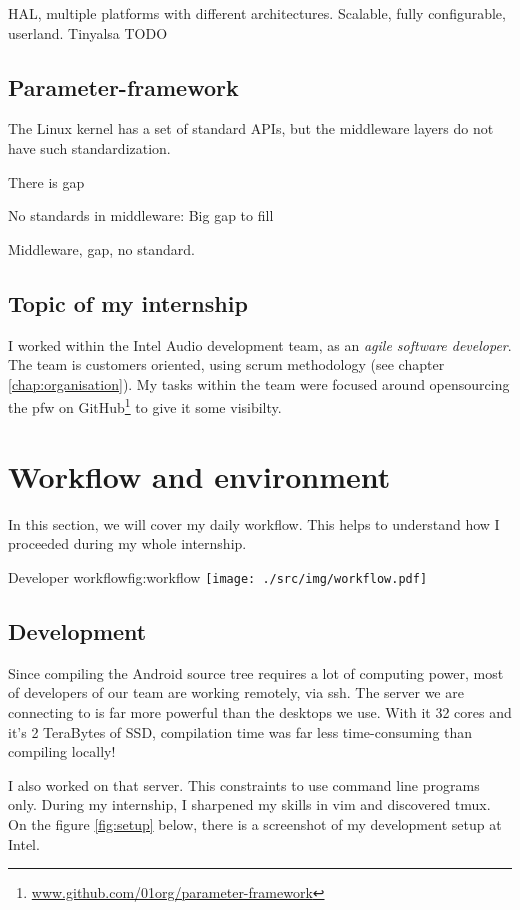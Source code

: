 HAL, multiple platforms with different architectures.
Scalable, fully configurable, userland.
Tinyalsa
TODO

\subsection{Parameter-framework}
\label{sec:parameter-framework}
The Linux \gls{kernel} has a set of standard APIs, but the middleware layers do not have such standardization.

There is gap

No standards in middleware:
Big gap to fill


Middleware, gap, no standard.

\subsection{Topic of my internship}

I worked within the Intel Audio development team, as an \emph{agile
software developer}. The team is customers oriented, using \gls{scrum}
methodology (see chapter \ref{chap:organisation}). My tasks
within the team were focused around opensourcing the \gls{pfw} on
GitHub\footnote{\url{www.github.com/01org/parameter-framework}} to give it some
visibilty.


\section{Workflow and environment}
In this section, we will cover my daily workflow. This helps
to understand how I proceeded during my whole internship.

\begin{figureGraphics}{Developer workflow}{fig:workflow}
    \texttt{[image: ./src/img/workflow.pdf]}
\end{figureGraphics}


\subsection{Development}
Since compiling the Android source tree requires a lot of computing power,
most of developers of our team are working remotely, via ssh.
The server we are connecting to is far more powerful than the desktops we use.
With it 32 cores and it's 2 TeraBytes of SSD, compilation time was far less time-consuming
than compiling locally!

I also worked on that server. This constraints to use command line programs only.
During my internship, I sharpened my skills in \gls{vim} and discovered \gls{tmux}.
On the figure \ref{fig:setup} below, there is a screenshot of my development setup at Intel.


